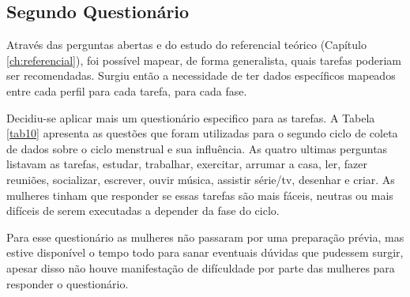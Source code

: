 \subsection{Segundo Questionário}
Através das perguntas abertas e do estudo do referencial teórico (Capítulo \ref{ch:referencial}), 
foi possível mapear, de forma generalista, quais tarefas poderiam ser 
recomendadas. Surgiu então a necessidade de ter dados específicos mapeados entre cada perfil para cada tarefa, 
para cada fase. 

Decidiu-se aplicar mais um questionário especifico para as tarefas.
A Tabela \ref{tab10} apresenta as questões que foram utilizadas para o segundo ciclo de coleta 
de dados sobre o ciclo menstrual e 
sua influência. As quatro ultimas perguntas listavam as tarefas, estudar, trabalhar, exercitar, arrumar a casa, 
ler, fazer reuniões, socializar, escrever, ouvir música, assistir série/tv, desenhar e criar. As 
mulheres tinham que responder se essas tarefas são mais fáceis, neutras ou mais difíceis de serem executadas 
a depender da fase do ciclo. 

Para esse questionário as mulheres não passaram por uma preparação prévia, mas estive disponível o tempo 
todo para sanar eventuais dúvidas que pudessem surgir, apesar disso não houve manifestação de difículdade por parte das mulheres 
para responder o questionário.


